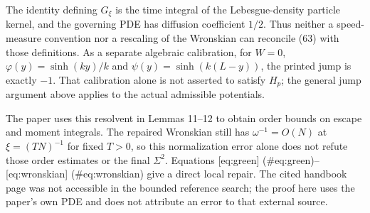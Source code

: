 \documentclass[10pt]{article}
\begin{document}
The identity defining \(G_\xi\) is the time integral of the Lebesgue-density particle kernel, and the governing PDE has diffusion coefficient \(1/2\). Thus neither a speed-measure convention nor a rescaling of the Wronskian can reconcile (63) with those definitions. As a separate algebraic calibration, for \(W=0\), \(\varphi(y)=\sinh(ky)/k\) and \(\psi(y)=\sinh(k(L-y))\), the printed jump is exactly \(-1\). That calibration alone is not asserted to satisfy \(H_p\); the general jump argument above applies to the actual admissible potentials.\par
The paper uses this resolvent in Lemmas 11–12 to obtain order bounds on escape and moment integrals. The repaired Wronskian still has \(\omega^{-1}=O(N)\) at \(\xi=(TN)^{-1}\) for fixed \(T>0\), so this normalization error alone does not refute those order estimates or the final \(\Sigma^2\). Equations [eq:green] (\#eq:green)–[eq:wronskian] (\#eq:wronskian) give a direct local repair. The cited handbook page was not accessible in the bounded reference search; the proof here uses the paper’s own PDE and does not attribute an error to that external source.\par
\end{document}
